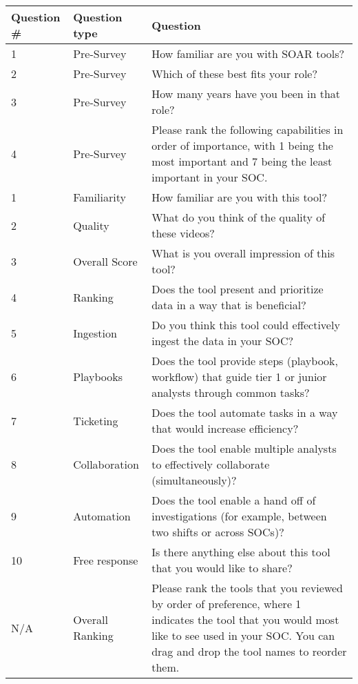 
\begin{center}
\begin{table}
\setlength\extrarowheight{4pt}
\begin{tabular}{  m{1.85cm}  m{2.5cm} m{8cm}  } 
 \toprule
  \textbf{Question} \# & \textbf{Question type} & \textbf{Question} \\
  \hline
  1 & Pre-Survey & How familiar are you with SOAR tools?\\ 
  2 &  Pre-Survey &  Which of these best fits your role?   \\ 
  3 & Pre-Survey & How many years have you been in that role? \\ 
  4 & Pre-Survey & Please rank the following capabilities in order of importance, with 1 being the most important and 7 being the least important in your SOC. \\ 
  \midrule
  1 & Familiarity & How familiar are you with this tool? \\
  2 & Quality & What do you think of the quality of these videos? \\ 
  3 & Overall Score & What is you overall impression of this tool? \\ 
  4 & Ranking & Does the tool present and prioritize data in a way that is beneficial? \\ 
  5 & Ingestion & Do you think this tool could effectively ingest the data in your SOC? \\ 
  6 & Playbooks & Does the tool provide steps (playbook, workflow) that guide tier 1 or junior analysts through common tasks? \\ 
  7 & Ticketing & Does the tool automate tasks in a way that would increase efficiency? \\ 
  8 & Collaboration & Does the tool enable multiple analysts to effectively collaborate (simultaneously)? \\ 
  9 & Automation & Does the tool enable a hand off of investigations (for example, between two shifts or across SOCs)? \\
  10 & Free response & Is there anything else about this tool that you would like to share? \\
  N/A & Overall Ranking & Please rank the tools that you reviewed by order of preference, where 1 indicates the tool that you would most like to see used in your SOC. You can drag and drop the tool names to reorder them. \\

\end{tabular}
\end{table}
\end{center}
